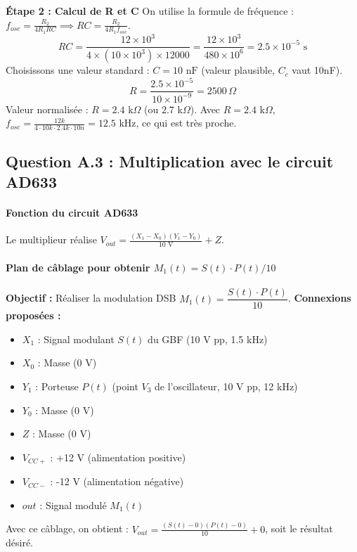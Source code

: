 \documentclass[11pt,a4paper]{article}
\begin{document}
\textbf{Étape 2 : Calcul de R et C}
On utilise la formule de fréquence : $f_{osc} = \frac{R_2}{4 R_1 RC} \implies RC = \frac{R_2}{4 R_1 f_{osc}}$.
\begin{equation}
RC = \frac{12 \times 10^3}{4 \times (10 \times 10^3) \times 12000} = \frac{12 \times 10^3}{480 \times 10^6} = 2.5 \times 10^{-5} \text{ s}
\end{equation}
Choisissons une valeur standard : $\boxed{C = 10 \text{ nF}}$ (valeur plausible, $C_c$ vaut 10nF).
\begin{equation}
R = \frac{2.5 \times 10^{-5}}{10 \times 10^{-9}} = 2500 \, \Omega
\end{equation}
Valeur normalisée : $\boxed{R = 2.4 \text{ k}\Omega}$ (ou $2.7$ k$\Omega$).
Avec $R=2.4$ k$\Omega$, $f_{osc} = \frac{12k}{4 \cdot 10k \cdot 2.4k \cdot 10n} = 12.5$ kHz, ce qui est très proche.

\subsection{Question A.3 : Multiplication avec le circuit AD633}

\paragraph{Fonction du circuit AD633}
Le multiplieur réalise $V_{out} = \frac{(X_1 - X_0)(Y_1 - Y_0)}{10\text{ V}} + Z$.

\paragraph{Plan de câblage pour obtenir $M_1(t) = S(t) \cdot P(t) / 10$}

\textbf{Objectif :} Réaliser la modulation DSB $M_1(t) = \dfrac{S(t) \cdot P(t)}{10}$.
\textbf{Connexions proposées :}
\begin{itemize}
    \item $X_1$ : Signal modulant $S(t)$ du GBF (10 V pp, 1.5 kHz)
    \item $X_0$ : Masse (0 V)
    \item $Y_1$ : Porteuse $P(t)$ (point $V_3$ de l'oscillateur, 10 V pp, 12 kHz)
    \item $Y_0$ : Masse (0 V)
    \item $Z$ : Masse (0 V)
    \item $V_{CC+}$ : +12 V (alimentation positive)
    \item $V_{CC-}$ : -12 V (alimentation négative)
    \item $out$ : Signal modulé $M_1(t)$
\end{itemize}
Avec ce câblage, on obtient : $V_{out} = \frac{(S(t) - 0)(P(t) - 0)}{10} + 0$, soit le résultat désiré.
\end{document}
